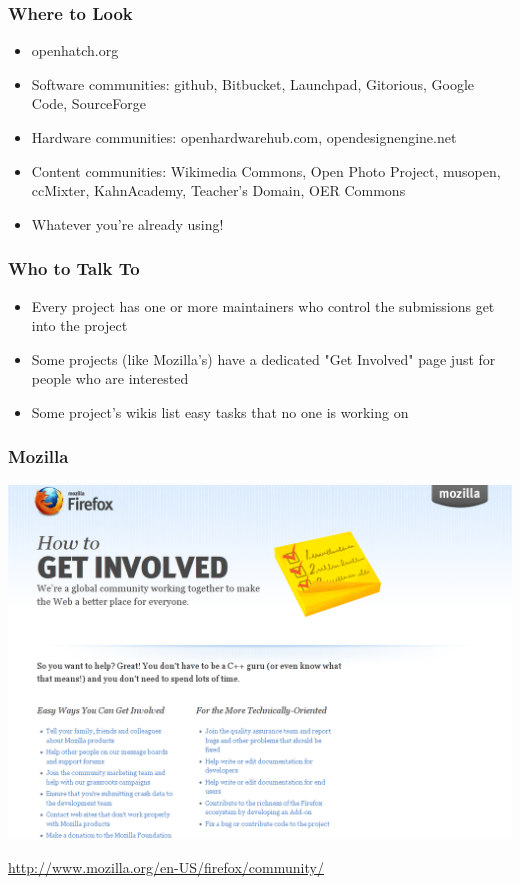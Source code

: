 \documentclass{beamer}
\begin{document}
\begin{frame}
  \frametitle{Where to Look}
  \begin{itemize}
  \item openhatch.org
  \item Software communities: github, Bitbucket, Launchpad, Gitorious, Google Code, SourceForge
  \item Hardware communities: openhardwarehub.com, opendesignengine.net
  \item Content communities: Wikimedia Commons, Open Photo Project, musopen, ccMixter, KahnAcademy, Teacher's Domain, OER Commons
  \item Whatever you're already using!
  \end{itemize}
\end{frame}

\begin{frame}
  \frametitle{Who to Talk To}
  \begin{itemize}
  \item Every project has one or more \textcolor{beamer@myblue}{maintainers} who control the submissions get into the project
  \item Some projects (like Mozilla's) have a dedicated "Get Involved" page just for people who are interested
  \item Some project's wikis list easy tasks that no one is working on
  \end{itemize}
\end{frame}

\begin{frame}
  \frametitle{Mozilla}
  \begin{center} 
    \includegraphics[height=0.8\textheight]{../img/mozilla-get-involved}

    \href{http://www.mozilla.org/en-US/firefox/community/}{http://www.mozilla.org/en-US/firefox/community/}
  \end{center}
\end{frame}
\end{document}
